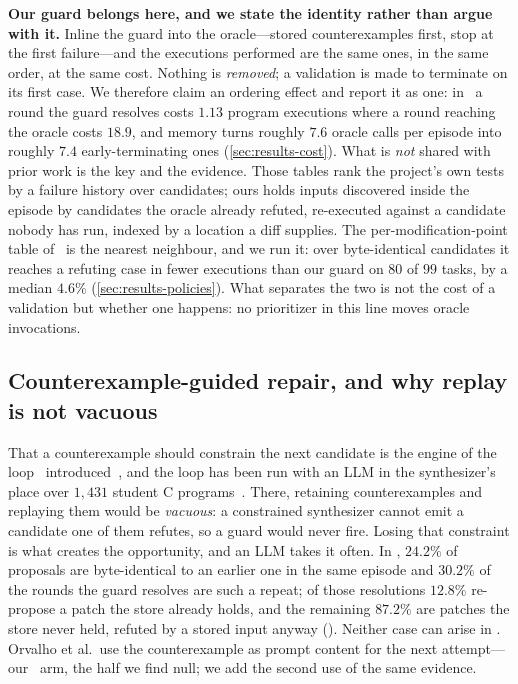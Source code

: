 \textbf{Our guard belongs here, and we state the identity rather than argue
with it.} Inline the guard into the oracle---stored counterexamples first, stop
at the first failure---and the executions performed are the same ones, in the
same order, at the same cost. Nothing is \emph{removed}; a validation is made
to terminate on its first case. We therefore claim an ordering effect and
report it as one: in \armtyped\ a round the guard resolves costs $1.13$
program executions where a round reaching the oracle costs $18.9$, and memory
turns roughly $7.6$ oracle calls per episode into roughly $7.4$
early-terminating ones (\cref{sec:results-cost}). What is \emph{not} shared with prior work is the key
and the evidence. Those tables rank the project's own tests by a failure
history over candidates; ours holds inputs discovered inside the episode by
candidates the oracle already refuted, re-executed against a candidate nobody
has run, indexed by a location a diff supplies. The per-modification-point
table of~\cite{venugopal2020modification} is the nearest neighbour, and we run
it: over byte-identical candidates it reaches a refuting case in fewer
executions than our guard on $80$ of $99$ tasks, by a median $4.6\%$
(\cref{sec:results-policies}). What separates the two is not the cost of a
validation but whether one happens: no prioritizer in this line moves oracle
invocations.

\subsection{Counterexample-guided repair, and why replay is not vacuous}
\label{sec:related-cegis}
That a counterexample should constrain the next candidate is the engine of the
loop \Sketch\ introduced~\cite{solarlezama2006sketching}, and the loop has been
run with an LLM in the synthesizer's place over $1{,}431$ student C
programs~\cite{orvalho2025counterexample}. There, retaining counterexamples and
replaying them would be \emph{vacuous}: a constrained synthesizer cannot emit a
candidate one of them refutes, so a guard would never fire. Losing that
constraint is what creates the opportunity, and an LLM takes it often. In
\armguard, $24.2\%$ of proposals are byte-identical to an earlier one in the
same episode and $30.2\%$ of the rounds the guard resolves are such a repeat;
of those resolutions $12.8\%$ re-propose a patch the store already holds, and
the remaining $87.2\%$ are patches the store never held, refuted by a stored
input anyway (). Neither case can arise in
\Sketch. Orvalho et al.\ use the counterexample as
prompt content for the next attempt---our \armsteer\ arm, the half we find
null; we add the second use of the same evidence.

